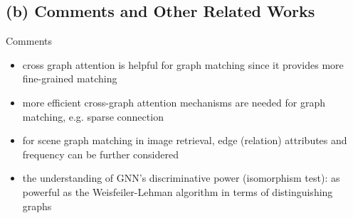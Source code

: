 \documentclass{beamer}
\begin{document}
\subsection{(b) Comments and Other Related Works}
\begin{frame}{Comments}
\begin{itemize}
    \item cross graph attention is helpful for graph matching since it provides more fine-grained matching 
    \item more efficient cross-graph attention mechanisms are needed for graph matching, e.g. sparse connection
    \item for scene graph matching in image retrieval, edge (relation) attributes and frequency can be further considered
    \item the understanding of GNN's discriminative power (isomorphism test): as powerful as the Weisfeiler-Lehman algorithm in terms of distinguishing graphs
\end{itemize}
\end{frame}
\end{document}
